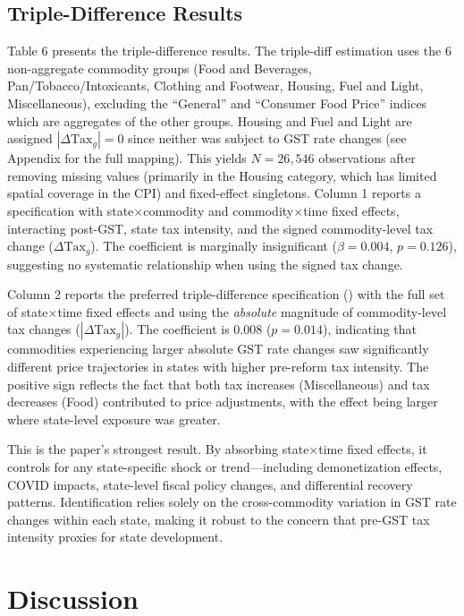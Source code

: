 \documentclass[12pt]{article}
\begin{document}
\subsection{Triple-Difference Results}

Table 6 presents the triple-difference results. The triple-diff estimation uses the 6 non-aggregate commodity groups (Food and Beverages, Pan/Tobacco/Intoxicants, Clothing and Footwear, Housing, Fuel and Light, Miscellaneous), excluding the ``General'' and ``Consumer Food Price'' indices which are aggregates of the other groups. Housing and Fuel and Light are assigned $|\Delta\text{Tax}_g| = 0$ since neither was subject to GST rate changes (see Appendix  for the full mapping). This yields $N = 26{,}546$ observations after removing missing values (primarily in the Housing category, which has limited spatial coverage in the CPI) and fixed-effect singletons. Column 1 reports a specification with state$\times$commodity and commodity$\times$time fixed effects, interacting post-GST, state tax intensity, and the signed commodity-level tax change ($\Delta\text{Tax}_g$). The coefficient is marginally insignificant ($\beta = 0.004$, $p = 0.126$), suggesting no systematic relationship when using the signed tax change.



Column 2 reports the preferred triple-difference specification () with the full set of state$\times$time fixed effects and using the \textit{absolute} magnitude of commodity-level tax changes ($|\Delta\text{Tax}_g|$). The coefficient is $0.008$ ($p = 0.014$), indicating that commodities experiencing larger absolute GST rate changes saw significantly different price trajectories in states with higher pre-reform tax intensity. The positive sign reflects the fact that both tax increases (Miscellaneous) and tax decreases (Food) contributed to price adjustments, with the effect being larger where state-level exposure was greater.

This is the paper's strongest result. By absorbing state$\times$time fixed effects, it controls for any state-specific shock or trend---including demonetization effects, COVID impacts, state-level fiscal policy changes, and differential recovery patterns. Identification relies solely on the cross-commodity variation in GST rate changes within each state, making it robust to the concern that pre-GST tax intensity proxies for state development.

\section{Discussion}\label{sec:discussion}
\end{document}
